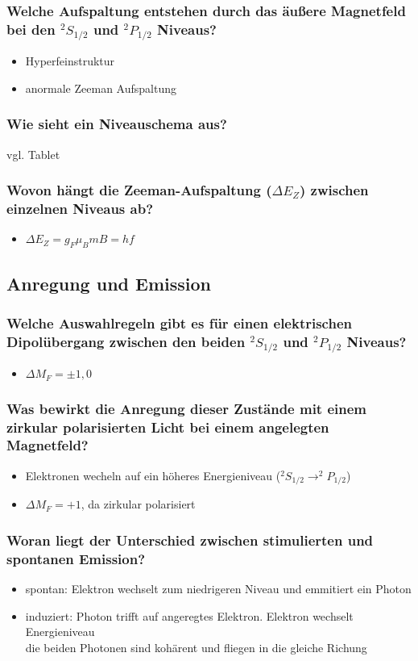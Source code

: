 \subsubsection[]{Welche Aufspaltung entstehen durch das äußere Magnetfeld bei den $^2S_{1/2}$ und $^2P_{1/2}$ Niveaus?}
\begin{itemize}
    \item Hyperfeinstruktur 
    \item anormale Zeeman Aufspaltung
\end{itemize}
\subsubsection[]{Wie sieht ein Niveauschema aus?}
vgl. Tablet
\subsubsection[]{Wovon hängt die Zeeman-Aufspaltung ($\Delta E_Z$) zwischen einzelnen Niveaus ab?}
\begin{itemize}
    \item $\Delta E_Z=g_F\mu_B m B=hf$
\end{itemize}

\subsection{Anregung und Emission}
\subsubsection[]{Welche Auswahlregeln gibt es für einen elektrischen Dipolübergang zwischen den beiden $^2S_{1/2}$ und $^2P_{1/2}$ Niveaus?}
\begin{itemize}
    \item $\Delta M_F=\pm 1, 0$
\end{itemize}
\subsubsection[]{Was bewirkt die Anregung dieser Zustände mit einem zirkular polarisierten Licht bei einem angelegten Magnetfeld?}
\begin{itemize}
    \item Elektronen wecheln auf ein höheres Energieniveau ($^2S_{1/2}\to ^2P_{1/2}$)
    \item $\Delta M_F=+1$, da zirkular polarisiert
\end{itemize}
\subsubsection[]{Woran liegt der Unterschied zwischen stimulierten und spontanen Emission?}
\begin{itemize}
    \item spontan: Elektron wechselt zum niedrigeren Niveau und emmitiert ein Photon
    \item induziert: Photon trifft auf angeregtes Elektron. Elektron wechselt Energieniveau\\
    \to die beiden Photonen sind kohärent und fliegen in die gleiche Richung
\end{itemize}
